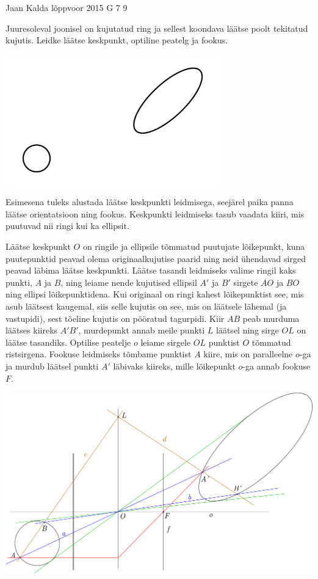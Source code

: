 {Jaan Kalda} %
{lõppvoor} %
{2015} %
{G 7} %
{9} %
{
\ifStatement
Juuresoleval joonisel on kujutatud ring ja sellest koondava läätse poolt tekitatud kujutis. Leidke läätse keskpunkt, optiline peatelg ja fookus.
\begin{center}
\includegraphics[width=0.7\textwidth]{2015-v3g-07-ringjaellips}%
\end{center}
\fi


\ifHint
Esimesena tuleks alustada läätse keskpunkti leidmisega, seejärel paika panna läätse orientatsioon ning fookus. Keskpunkti leidmiseks tasub vaadata kiiri, mis puutuvad nii ringi kui ka ellipsit.
\fi


\ifSolution
Läätse keskpunkt $O$ on ringile ja ellipsile tõmmatud puutujate lõikepunkt, kuna puutepunktid peavad olema originaalkujutise paarid ning neid ühendavad sirged peavad läbima läätse keskpunkti. Läätse tasandi leidmiseks valime ringil kaks punkti, $A$ ja $B$, ning leiame nende kujutised ellipsil $A'$ ja $B'$ sirgete $AO$ ja $BO$ ning ellipsi lõikepunktidena. Kui originaal on ringi kahest lõikepunktist see, mis asub läätsest kaugemal, siis selle kujutis on see, mis on läätsele lähemal (ja vastupidi), sest tõeline kujutis on pööratud tagurpidi. Kiir $AB$ peab murduma läätses kiireks $A'B'$, murdepunkt annab meile punkti $L$ läätsel ning sirge $OL$ on läätse tasandiks. Optilise peatelje $o$ leiame sirgele $OL$ punktist $O$ tõmmatud ristsirgena. Fookuse leidmiseks tõmbame punktist $A$ kiire, mis on paralleelne $o$-ga ja murdub läätsel punkti $A'$ läbivaks kiireks, mille lõikepunkt $o$-ga annab fookuse $F$.

\begin{center}
\includegraphics[width=\textwidth]{2015-v3g-07-ellips_lah}
\end{center}
\fi


}
